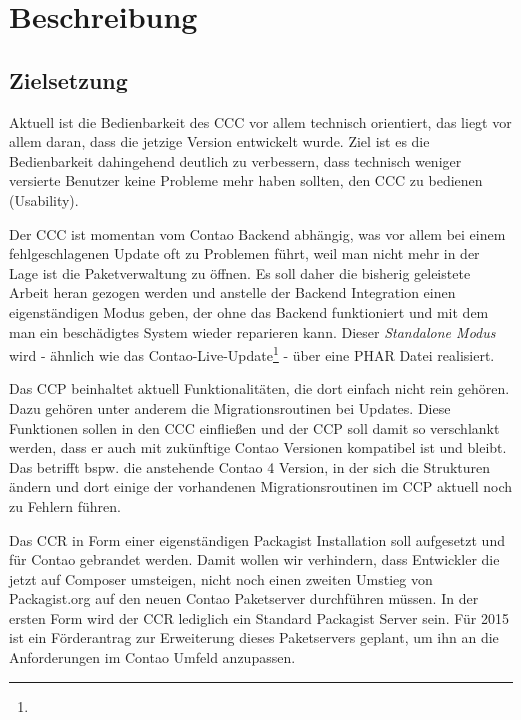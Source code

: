 \documentclass[
paper=a4,
draft=false,%
fontsize=10pt%
]{scrartcl}
\begin{document}
\newpage

%
%

\section{Beschreibung}
\label{sec:description}

\subsection{Zielsetzung}

Aktuell ist die Bedienbarkeit des CCC vor allem technisch orientiert, das liegt vor allem daran, dass die jetzige Version  entwickelt wurde. Ziel ist es die Bedienbarkeit dahingehend deutlich zu verbessern, dass technisch weniger versierte Benutzer keine Probleme mehr haben sollten, den CCC zu bedienen (Usability).

Der CCC ist momentan vom Contao Backend abhängig, was vor allem bei einem fehlgeschlagenen Update oft zu Problemen führt, weil man nicht mehr in der Lage ist die Paketverwaltung zu öffnen. Es soll daher die bisherig geleistete Arbeit heran gezogen werden und anstelle der Backend Integration einen eigenständigen Modus geben, der ohne das Backend funktioniert und mit dem man ein beschädigtes System wieder reparieren kann. Dieser \textit{Standalone Modus} wird - ähnlich wie das Contao-Live-Update\footnote{} - über eine PHAR Datei realisiert.

Das CCP beinhaltet aktuell Funktionalitäten, die dort einfach nicht rein gehören. Dazu gehören unter anderem die Migrationsroutinen bei Updates. Diese Funktionen sollen in den CCC einfließen und der CCP soll damit so verschlankt werden, dass er auch mit zukünftige Contao Versionen kompatibel ist und bleibt. Das betrifft bspw. die anstehende Contao 4 Version, in der sich die Strukturen ändern und dort einige der vorhandenen Migrationsroutinen im CCP aktuell noch zu Fehlern führen.

Das CCR in Form einer eigenständigen Packagist Installation soll aufgesetzt und für Contao gebrandet werden. Damit wollen wir verhindern, dass Entwickler die jetzt auf Composer umsteigen, nicht noch einen zweiten Umstieg von Packagist.org auf den neuen Contao Paketserver durchführen müssen. In der ersten Form wird der CCR lediglich ein Standard Packagist Server sein. Für 2015 ist ein Förderantrag zur Erweiterung dieses Paketservers geplant, um ihn an die Anforderungen im Contao Umfeld anzupassen.
\end{document}
